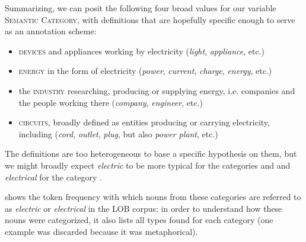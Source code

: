 Summarizing, we can posit the following four broad values for our variable \textsc{Semantic Category}, with definitions that are hopefully specific enough to serve as an annotation  scheme:

\begin{itemize}

\item \textsc{devices} and appliances working by electricity (\textit{light}, \textit{appliance}, etc.)

\item \textsc{energy} in the form of electricity (\textit{power}, \textit{current}, \textit{charge}, \textit{energy}, etc.)

\item the \textsc{industry} researching, producing or supplying energy, i.e. companies and the people working there (\textit{company}, \textit{engineer}, etc.)

\item \textsc{circuits}, broadly defined as entities producing or carrying electricity, including (\textit{cord}, \textit{outlet}, \textit{plug}, but also \textit{power plant}, etc.)

\end{itemize}

The definitions are too heterogeneous to base a specific hypothesis on them, but we might broadly expect \textit{electric} to be more typical for the categories  and  and \textit{electrical} for the category .

 shows the token  frequency  with which nouns  from these categories are referred to as \textit{electric} or \textit{electrical} in the LOB  corpus; in order to understand how these nouns were categorized,  it also lists all types  found for each category (one example was discarded because it was   metaphorical).

